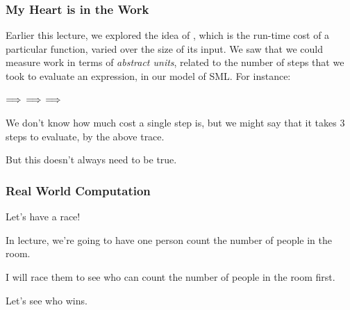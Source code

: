 \documentclass[aspectratio=169, handout]{beamer}
\begin{document}



\begin{frame}[fragile]
  \frametitle{My Heart is in the Work}

  Earlier this lecture, we explored the idea of , which is the run-time cost of a particular function,
  varied over the size of its input. We saw that we could measure work in terms of \textit{abstract units}, related 
  to the number of steps that we took to evaluate an expression, in our model of SML. For instance:

  \pause
  \vspace{5pt}

   $\Longrightarrow$  $\Longrightarrow$  $\Longrightarrow$  

  \pause
  \vspace{\fill}

  We don't know how much cost a single step is, but we might say that it takes 3 steps to evaluate,
  by the above trace. 

  \pause
  \vspace{\fill}

  But this doesn't always need to be true.
\end{frame}

\begin{frame}[fragile]
  \frametitle{Real World Computation}

  Let's have a race! 

  \pause
  \vspace{\fill}

  In lecture, we're going to have one person count the number of people in the room.

  \pause
  \vspace{\fill}

  I will race them to see who can count the number of people in the room first.

  \pause
  \vspace{\fill}

  Let's see who wins.

\end{frame}
\end{document}
